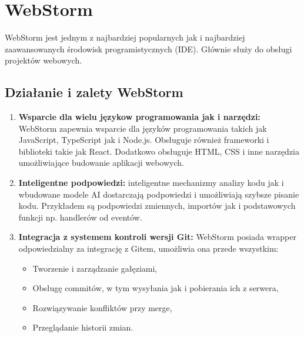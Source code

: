 \section{WebStorm}
WebStorm jest jednym z najbardziej popularnych jak i najbardziej zaawansowanych środowisk programistycznych (IDE). Głównie służy do obsługi projektów webowych.
\subsection{Działanie i zalety WebStorm}
\begin{enumerate}
    \item \textbf{Wsparcie dla wielu językow programowania jak i narzędzi:}
    WebStorm zapewnia wsparcie dla języków programowania takich jak JavaScript, TypeScript jak i Node.js. Obsługuje również frameworki i biblioteki takie jak React. Dodatkowo obsługuje HTML, CSS i inne narzędzia umożliwiające budowanie aplikacji webowych.
    \item \textbf{Inteligentne podpowiedzi:} inteligentne mechanizmy analizy kodu jak i wbudowane modele AI dostarczają podpowiedzi i umożliwiają szybsze pisanie kodu. Przykładem są podpowiedzi zmiennych, importów jak i podstawowych funkcji np. handlerów od eventów.
    \item \textbf{Integracja z systemem kontroli wersji Git:} WebStorm posiada wrapper odpowiedzialny za integrację z Gitem, umożliwia ona przede wszystkim:
    \begin{itemize}
        \item Tworzenie i zarządzanie gałęziami,
        \item Obsługę commitów, w tym wysyłania jak i pobierania ich z serwera,
        \item Rozwiązywanie konfliktów przy merge,
        \item Przeglądanie historii zmian.
    \end{itemize}
\end{enumerate}
